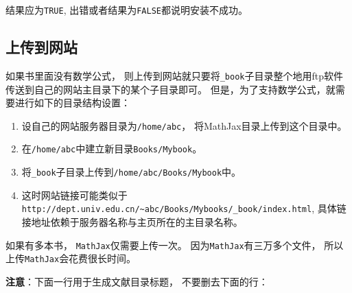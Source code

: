 \documentclass[
]{article}
\providecommand{\tightlist}{%
  \setlength{\itemsep}{0pt}\setlength{\parskip}{0pt}}
\begin{document}
结果应为\texttt{TRUE},
出错或者结果为\texttt{FALSE}都说明安装不成功。

\subsection{上传到网站}\label{usage-website}

如果书里面没有数学公式，
则上传到网站就只要将\texttt{\_book}子目录整个地用ftp软件传送到自己的网站主目录下的某个子目录即可。
但是，为了支持数学公式，就需要进行如下的目录结构设置：

\begin{enumerate}
\def\labelenumi{\arabic{enumi}.}
\tightlist
\item
  设自己的网站服务器目录为\texttt{/home/abc}，
  将MathJax目录上传到这个目录中。
\item
  在\texttt{/home/abc}中建立新目录\texttt{Books/Mybook}。
\item
  将\texttt{\_book}子目录上传到\texttt{/home/abc/Books/Mybook}中。
\item
  这时网站链接可能类似于\texttt{http://dept.univ.edu.cn/\textasciitilde{}abc/Books/Mybooks/\_book/index.html},
  具体链接地址依赖于服务器名称与主页所在的主目录名称。
\end{enumerate}

如果有多本书，
\texttt{MathJax}仅需要上传一次。
因为\texttt{MathJax}有三万多个文件，
所以上传\texttt{MathJax}会花费很长时间。

\textbf{注意}：下面一行用于生成文献目录标题，
不要删去下面的行：

\printbibliography
\end{document}
